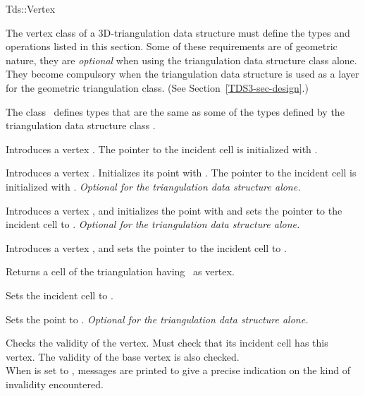 	\begin{ccClass}{Tds::Vertex}

The vertex class of a 3D-triangulation data structure must define
the types and operations listed in this section. Some of these
requirements are of geometric nature, they are \textit{optional}
when using the triangulation data structure class alone. They become
compulsory when the triangulation data structure is used as a layer
for the geometric triangulation class. (See Section~\ref{TDS3-sec-design}.)

\ccTypes
{}
\ccThreeToTwo
{} 

The class \ccClassName\ defines types that are the same as some of the 
types defined by the triangulation data structure class .

\ccGlue
{}

\ccCreation
{}

{Introduces a vertex \ccVar. 
The pointer to the incident cell is initialized with .}

{Introduces a vertex \ccVar. Initializes its point with .
The pointer to the incident cell is initialized with
. {\textit{Optional for the triangulation data structure alone.}}}

{Introduces a vertex \ccVar, and initializes the point with 
and sets the pointer to the incident cell to . {\textit{Optional for the
triangulation data structure alone.}}}

{Introduces a vertex \ccVar, and sets the pointer to the incident cell
to .}

\ccAccessFunctions

{Returns a cell of the triangulation having \ccVar\ as vertex.}


{Sets the incident cell to .}

{Sets the point to . {\textit{Optional for the
triangulation data structure alone.}}}

\begin{ccAdvanced}

{Checks the validity of the vertex. Must check that its incident cell
has this vertex. The validity of the base vertex is also checked.\\
When  is set to , messages are printed to give
a precise indication on the kind of invalidity encountered.}
\end{ccAdvanced}

	\end{ccClass} 

